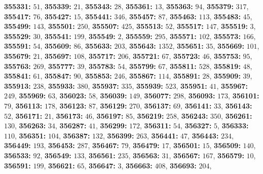 \textsf{\bfseries 355331:} $51$, \textsf{\bfseries 355339:} $21$, \textsf{\bfseries 355343:} $28$, \textsf{\bfseries 355361:} $13$, \textsf{\bfseries 355363:} $94$, \textsf{\bfseries 355379:} $317$, \textsf{\bfseries 355417:} $76$, \textsf{\bfseries 355427:} $15$, \textsf{\bfseries 355441:} $346$, \textsf{\bfseries 355457:} $87$, \textsf{\bfseries 355463:} $113$, \textsf{\bfseries 355483:} $45$, \textsf{\bfseries 355499:} $143$, \textsf{\bfseries 355501:} $250$, \textsf{\bfseries 355507:} $425$, \textsf{\bfseries 355513:} $52$, \textsf{\bfseries 355517:} $147$, \textsf{\bfseries 355519:} $3$, \textsf{\bfseries 355529:} $30$, \textsf{\bfseries 355541:} $199$, \textsf{\bfseries 355549:} $2$, \textsf{\bfseries 355559:} $295$, \textsf{\bfseries 355571:} $102$, \textsf{\bfseries 355573:} $166$, \textsf{\bfseries 355591:} $54$, \textsf{\bfseries 355609:} $86$, \textsf{\bfseries 355633:} $203$, \textsf{\bfseries 355643:} $1352$, \textsf{\bfseries 355651:} $35$, \textsf{\bfseries 355669:} $101$, \textsf{\bfseries 355679:} $21$, \textsf{\bfseries 355697:} $108$, \textsf{\bfseries 355717:} $206$, \textsf{\bfseries 355721:} $67$, \textsf{\bfseries 355723:} $46$, \textsf{\bfseries 355753:} $95$, \textsf{\bfseries 355763:} $269$, \textsf{\bfseries 355777:} $39$, \textsf{\bfseries 355783:} $54$, \textsf{\bfseries 355799:} $67$, \textsf{\bfseries 355811:} $528$, \textsf{\bfseries 355819:} $48$, \textsf{\bfseries 355841:} $61$, \textsf{\bfseries 355847:} $90$, \textsf{\bfseries 355853:} $246$, \textsf{\bfseries 355867:} $114$, \textsf{\bfseries 355891:} $28$, \textsf{\bfseries 355909:} $39$, \textsf{\bfseries 355913:} $238$, \textsf{\bfseries 355933:} $380$, \textsf{\bfseries 355937:} $335$, \textsf{\bfseries 355939:} $523$, \textsf{\bfseries 355951:} $41$, \textsf{\bfseries 355967:} $249$, \textsf{\bfseries 355969:} $63$, \textsf{\bfseries 356023:} $58$, \textsf{\bfseries 356039:} $149$, \textsf{\bfseries 356077:} $298$, \textsf{\bfseries 356093:} $173$, \textsf{\bfseries 356101:} $79$, \textsf{\bfseries 356113:} $178$, \textsf{\bfseries 356123:} $87$, \textsf{\bfseries 356129:} $270$, \textsf{\bfseries 356137:} $69$, \textsf{\bfseries 356141:} $33$, \textsf{\bfseries 356143:} $52$, \textsf{\bfseries 356171:} $21$, \textsf{\bfseries 356173:} $46$, \textsf{\bfseries 356197:} $85$, \textsf{\bfseries 356219:} $258$, \textsf{\bfseries 356243:} $350$, \textsf{\bfseries 356261:} $130$, \textsf{\bfseries 356263:} $34$, \textsf{\bfseries 356287:} $41$, \textsf{\bfseries 356299:} $172$, \textsf{\bfseries 356311:} $54$, \textsf{\bfseries 356327:} $5$, \textsf{\bfseries 356333:} $110$, \textsf{\bfseries 356351:} $104$, \textsf{\bfseries 356387:} $132$, \textsf{\bfseries 356399:} $263$, \textsf{\bfseries 356441:} $47$, \textsf{\bfseries 356443:} $234$, \textsf{\bfseries 356449:} $193$, \textsf{\bfseries 356453:} $287$, \textsf{\bfseries 356467:} $79$, \textsf{\bfseries 356479:} $17$, \textsf{\bfseries 356501:} $15$, \textsf{\bfseries 356509:} $140$, \textsf{\bfseries 356533:} $92$, \textsf{\bfseries 356549:} $133$, \textsf{\bfseries 356561:} $235$, \textsf{\bfseries 356563:} $31$, \textsf{\bfseries 356567:} $167$, \textsf{\bfseries 356579:} $10$, \textsf{\bfseries 356591:} $199$, \textsf{\bfseries 356621:} $65$, \textsf{\bfseries 356647:} $3$, \textsf{\bfseries 356663:} $408$, \textsf{\bfseries 356693:} $204$, 
